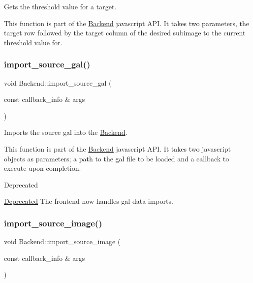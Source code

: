 Gets the threshold value for a target. 

This function is part of the \hyperlink{class_backend}{Backend} javascript A\+PI. It takes two parameters, the target row followed by the target column of the desired subimage to the current threshold value for. \mbox{\label{class_backend_a874fced9ef73eda11ce1489b5ec4838e}} 
\subsubsection{\texorpdfstring{import\+\_\+source\+\_\+gal()}{import\_source\_gal()}}
{\footnotesize\ttfamily void Backend\+::import\+\_\+source\+\_\+gal (\begin{DoxyParamCaption}\item[{const callback\+\_\+info \&}]{args }\end{DoxyParamCaption})\hspace{0.3cm}{\ttfamily [static]}}



Imports the source gal into the \hyperlink{class_backend}{Backend}. 

This function is part of the \hyperlink{class_backend}{Backend} javascript A\+PI. It takes two javascript objects as parameters; a path to the gal file to be loaded and a callback to execute upon completion.

\begin{DoxyRefDesc}{Deprecated}
\item[\hyperlink{deprecated__deprecated000001}{Deprecated}]The frontend now handles gal data imports. \end{DoxyRefDesc}
\mbox{\label{class_backend_aef5331c3d0f698924124af87c2d5877c}} 
\subsubsection{\texorpdfstring{import\+\_\+source\+\_\+image()}{import\_source\_image()}}
{\footnotesize\ttfamily void Backend\+::import\+\_\+source\+\_\+image (\begin{DoxyParamCaption}\item[{const callback\+\_\+info \&}]{args }\end{DoxyParamCaption})\hspace{0.3cm}{\ttfamily [static]}}



